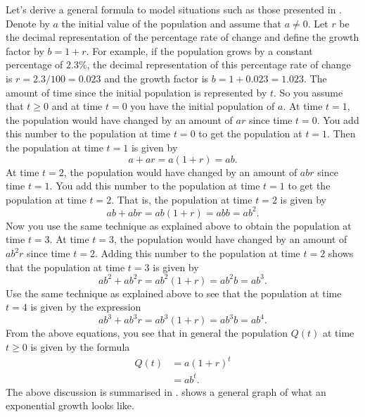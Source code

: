 \documentclass[a4paper,oneside,12pt]{article}
\begin{document}
Let's derive a general formula to model situations such as those
presented in .  Denote by $a$
the initial value of the population and assume that $a \neq 0$.  Let
$r$ be the decimal representation of the percentage rate of change and
define the growth factor by $b = 1 + r$.  For example, if the
population grows by a constant percentage of $2.3\%$, the decimal
representation of this percentage rate of change is
$r = 2.3 / 100 = 0.023$ and the growth factor is
$b = 1 + 0.023 = 1.023$.  The amount of time since the initial
population is represented by $t$.  So you assume that $t \geq 0$ and
at time $t = 0$ you have the initial population of $a$.  At time
$t = 1$, the population would have changed by an amount of $ar$ since
time $t = 0$.  You add this number to the population at time $t = 0$
to get the population at $t = 1$.  Then the population at time $t = 1$
is given by
\[
a + ar
=
a(1 + r)
=
ab.
\]
At time $t = 2$, the population would have changed by an amount of
$abr$ since time $t = 1$.  You add this number to the population at
time $t = 1$ to get the population at time $t = 2$.  That is, the
population at time $t = 2$ is given by
\[
ab + abr
=
ab(1 + r)
=
abb
=
ab^2.
\]
Now you use the same technique as explained above to obtain the
population at time $t = 3$.  At time $t = 3$, the population would
have changed by an amount of $ab^2r$ since time $t = 2$.  Adding this
number to the population at time $t = 2$ shows that the population at
time $t = 3$ is given by
\[
ab^2 + ab^2r
=
ab^2 (1 + r)
=
ab^2b
=
ab^3.
\]
Use the same technique as explained above to see that the population
at time $t = 4$ is given by the expression
\[
ab^3 + ab^3r
=
ab^3 (1 + r)
=
ab^3b
=
ab^4.
\]
From the above equations, you see that in general the population
$Q(t)$ at time $t \geq 0$ is given by the formula
\begin{equation}
\label{eqn:exponential_growth}
\begin{aligned}
Q(t)
&=
a(1 + r)^t \\[4pt]
&=
ab^t.
\end{aligned}
\end{equation}
The above discussion is summarised in
.
 shows a general graph of what
an exponential growth looks like.
\end{document}
